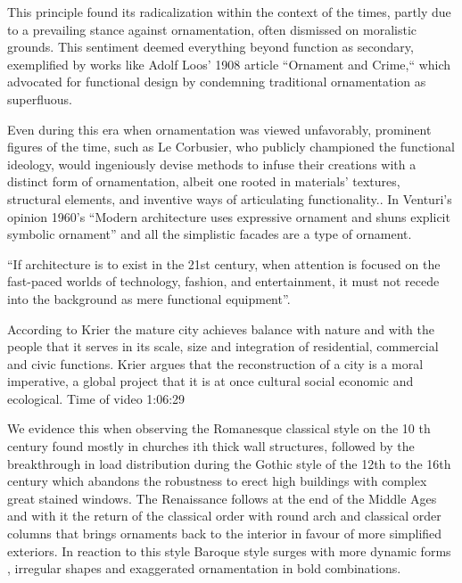 This principle found its radicalization within the context of the times, partly due to a prevailing stance against ornamentation, often dismissed on moralistic grounds.
This sentiment deemed everything beyond function as secondary, exemplified by works like Adolf Loos' 1908 article ``Ornament and Crime,`` which advocated for functional design by condemning traditional ornamentation as superfluous\cite{Saglam2014}.

Even during this era when ornamentation was viewed unfavorably, prominent figures of the time, such as Le Corbusier, who publicly championed the functional ideology, would ingeniously devise methods to infuse their creations with a distinct form of ornamentation, albeit one rooted in materials' textures, structural elements, and inventive ways of articulating functionality.\cite{Saglam2014}.
In Venturi's opinion\cite{Venturi1972} 1960's ``Modern architecture uses expressive ornament and shuns explicit symbolic  ornament'' and all the simplistic facades are a type of ornament\cite{Saglam2014}.

          ``If architecture is to exist in the 21st century, when attention is focused on the fast-paced worlds of technology, fashion, and entertainment, it must not recede into the background as mere functional equipment''\cite{Gage2015}.

          According to Krier the mature city achieves balance with nature and with the people that it serves in its scale, size and integration of residential, commercial and civic functions.
          Krier argues that the reconstruction of a city is a moral imperative, a global project that it is at once cultural social economic and ecological. Time of video 1:06:29

We evidence this when observing the Romanesque classical style on the 10 th century found mostly in churches ith thick wall structures, followed by the breakthrough in load distribution during the Gothic style of the 12th to the 16th century which abandons the robustness to erect high buildings with complex great stained windows.
The Renaissance follows at the end of the Middle Ages and with it the return of the classical order with round arch and classical order columns that brings ornaments back to the interior in favour of more simplified exteriors.
In reaction to this style Baroque style surges with more dynamic forms , irregular shapes and exaggerated ornamentation in bold combinations.

